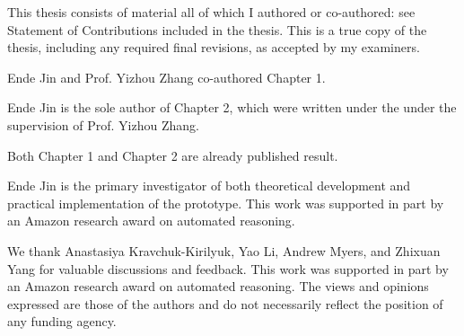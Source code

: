 


\vspace*{\fill}
\begin{center}
  \textsc{\Huge \thetitle}
\end{center}


\vspace*{\fill}

\newpage

\setcounter{page}{1}

\vspace*{\fill}


This thesis consists of material all of which I authored or co-authored: see Statement of Contributions included in the thesis. This is a true copy of the thesis, including any required final revisions, as accepted by my examiners.

\vspace*{\fill}

\newpage 


\vspace*{\fill}


Ende Jin and Prof. Yizhou Zhang co-authored Chapter 1.

Ende Jin is the sole author of Chapter 2, which were written under the  under the supervision of Prof. Yizhou Zhang.

Both Chapter 1 and Chapter 2 are already published result.

 Ende Jin is the primary investigator of both theoretical development and practical implementation of the prototype. This work was supported in part by an Amazon research award on automated
reasoning.

\vspace*{\fill}

\newpage


\vspace*{\fill}


\vspace*{\fill}


\newpage


\vspace*{\fill}

We thank Anastasiya Kravchuk-Kirilyuk, Yao Li, Andrew Myers, and Zhixuan Yang
for valuable discussions and feedback.
This work was supported in part by an Amazon research award on automated
reasoning.
The views and opinions expressed are those of the authors and do not necessarily
reflect the position of any funding agency.
\vspace*{\fill}

\newpage
\tableofcontents

\newpage 

\vspace*{\fill}
\listoffigures


\vspace*{\fill}